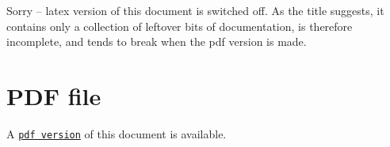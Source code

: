

 
{\bf
\begin{center}
Sorry -- latex version of this document is switched off. As the title
suggests, it contains only a collection of leftover bits of
documentation, is therefore incomplete, and tends to break
when the pdf version is made.
\end{center}
}




 

 \hypertarget{index_pdf}{}\section{P\+D\+F file}\label{index_pdf}
A \href{../latex/refman.pdf}{\tt pdf version} of this document is available. 
